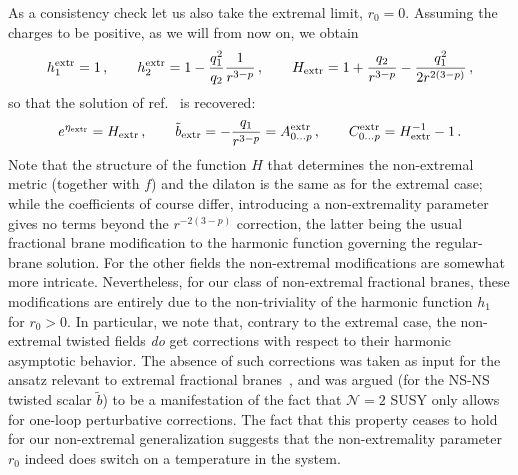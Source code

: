 \documentclass[a4paper,11pt]{article}
\begin{document}
As a consistency check let us also take the extremal limit, $r_0=0$.
Assuming the charges to be positive, as we will from now on, we obtain
\begin{equation}
\label{exth1h2}
h_1^{\mathrm{extr}} = 1 \,,\qquad h_2^{\mathrm{extr}} = 1 -
\frac{q_1^2}{q_2} \frac{1}{r^{3-p}} \,,\qquad H_{\mathrm{extr}} = 1 +
\frac{q_2}{r^{3-p}} - \frac{q_1^2}{2r^{2(3-p)}} \,,
\end{equation}
so that the solution of ref.~\cite{Frau:2000gk} is recovered:
\begin{equation}
e^{\eta_{\mathrm{extr}}} = H_{\mathrm{extr}} \,,\qquad
\tilde{b}_{\mathrm{extr}} = - \frac{q_1}{r^{3-p}}  = A_{0\ldots
p}^{\mathrm{extr}} \,,\qquad C_{0\ldots p}^{\mathrm{extr}} =
H^{-1}_{\mathrm{extr}} - 1 \,.
\end{equation}
Note that the structure of the function $H$ that determines the non-extremal 
metric (together with $f$) and the dilaton is the same as for the extremal
case; while the coefficients of course differ, introducing a
non-extremality parameter gives no terms beyond the $r^{-2(3-p)}$
correction, the latter being the usual fractional brane modification
to the harmonic function governing the regular-brane solution. For the
other fields the non-extremal modifications are somewhat more
intricate. Nevertheless, for our class of non-extremal fractional
branes, these modifications are entirely due to the non-triviality of
the harmonic function $h_1$ for $r_0>0$. In particular, we note that,
contrary to the extremal case, the non-extremal twisted fields
\emph{do} get corrections with respect to their harmonic asymptotic
behavior. The absence of such corrections was taken as input for the
ansatz relevant to extremal fractional branes~\cite{Frau:2000gk}, and
was argued (for the NS-NS twisted scalar $\tilde{b}$) to be a
manifestation of the fact that $\mathcal{N}=2$ SUSY only allows for
one-loop perturbative corrections. The fact that this property ceases
to hold for our non-extremal generalization suggests that the
non-extremality parameter $r_0$ indeed does switch on a temperature in
the system.
\end{document}
